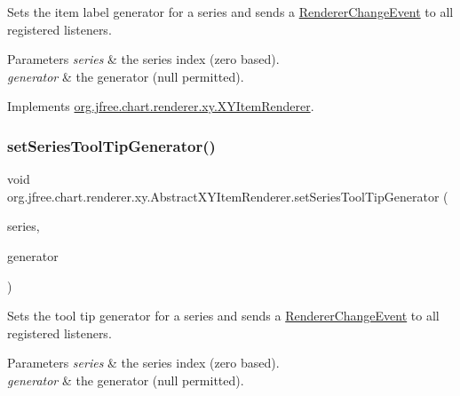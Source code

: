 Sets the item label generator for a series and sends a \mbox{\hyperlink{}{Renderer\+Change\+Event}} to all registered listeners.


\begin{DoxyParams}{Parameters}
{\em series} & the series index (zero based). \\
\hline
{\em generator} & the generator ({\ttfamily null} permitted). \\
\hline
\end{DoxyParams}


Implements \mbox{\hyperlink{interfaceorg_1_1jfree_1_1chart_1_1renderer_1_1xy_1_1_x_y_item_renderer_a8887feead656e9b57ce1bb2847c1421c}{org.\+jfree.\+chart.\+renderer.\+xy.\+X\+Y\+Item\+Renderer}}.

\mbox{\label{classorg_1_1jfree_1_1chart_1_1renderer_1_1xy_1_1_abstract_x_y_item_renderer_ad8d45b15b9f1e83e417bbf84fb542058}} 
\subsubsection{\texorpdfstring{set\+Series\+Tool\+Tip\+Generator()}{setSeriesToolTipGenerator()}}
{\footnotesize\ttfamily void org.\+jfree.\+chart.\+renderer.\+xy.\+Abstract\+X\+Y\+Item\+Renderer.\+set\+Series\+Tool\+Tip\+Generator (\begin{DoxyParamCaption}\item[{int}]{series,  }\item[{\mbox{\hyperlink{interfaceorg_1_1jfree_1_1chart_1_1labels_1_1_x_y_tool_tip_generator}{X\+Y\+Tool\+Tip\+Generator}}}]{generator }\end{DoxyParamCaption})}

Sets the tool tip generator for a series and sends a \mbox{\hyperlink{}{Renderer\+Change\+Event}} to all registered listeners.


\begin{DoxyParams}{Parameters}
{\em series} & the series index (zero based). \\
\hline
{\em generator} & the generator ({\ttfamily null} permitted). \\
\hline
\end{DoxyParams}


